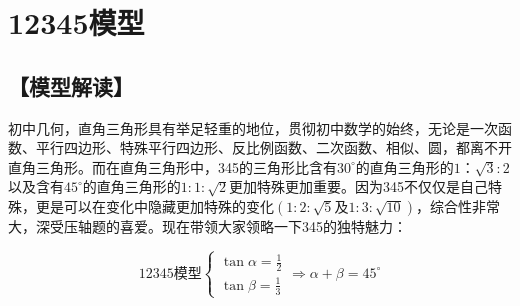 \section{12345模型}
\subsection{【模型解读】}

初中几何，直角三角形具有举足轻重的地位，贯彻初中数学的始终，无论是一次函数、平行四边形、特殊平行四边形、反比例函数、二次函数、相似、圆，都离不开直角三角形。而在直角三角形中，345的三角形比含有$30^\circ$的直角三角形的$1：\sqrt{3}:2$以及含有$45^\circ$的直角三角形的$1:1:\sqrt{2}$更加特殊更加重要。因为345不仅仅是自己特殊，更是可以在变化中隐藏更加特殊的变化$(1:2:\sqrt{5}\text{及}1:3:\sqrt{10})$，综合性非常大，深受压轴题的喜爱。现在带领大家领略一下345的独特魅力：

\[ \text{12345模型}\begin{cases}
\tan \alpha=\frac{1}{2}\\

\tan \beta=\frac{1}{3}
\end{cases} \Rightarrow \alpha+\beta=45^\circ \]